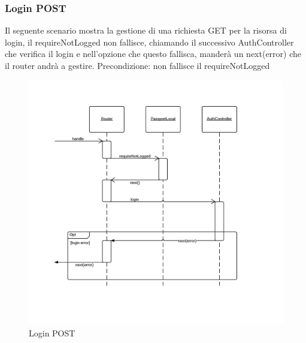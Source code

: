 \subsubsection{Login POST} 
Il seguente scenario mostra la gestione di una richiesta GET per la risorsa di login, il requireNotLogged non fallisce, chiamando il successivo  AuthController che verifica il login e nell'opzione che questo fallisca, manderà un next(error) che il router andrà a gestire.
Precondizione: non fallisce il requireNotLogged
\begin{figure}[H]
	\begin{center} 
		\includegraphics[scale=0.60]{scenari/login POST.png} 
		\caption{Login POST}
	\end{center} 
\end{figure} 

